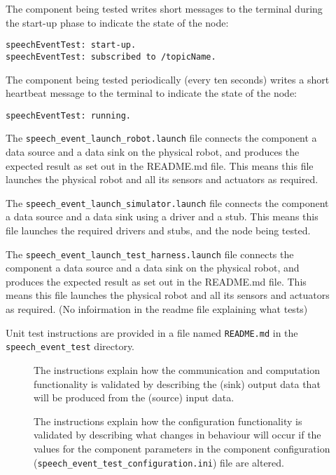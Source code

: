 \documentclass{CSSRforAfrica}
\newcommand{\checkboxChecked}{\fbox{\ding{51}}} %
\newcommand{\checkboxDashed}{\fbox{--}}         %
\begin{document}
\begin{description}
\item[\checkboxChecked]  The component being tested writes short messages to the terminal during the start-up phase to indicate the state of the node:
{\small 
\begin{verbatim}
speechEventTest: start-up.
speechEventTest: subscribed to /topicName.
\end{verbatim}}

\item[\checkboxChecked]   The component being tested periodically (every ten seconds) writes a short heartbeat message to the terminal to indicate the state of the node:
{\small 
\begin{verbatim}
speechEventTest: running.
\end{verbatim}}

\item[\checkboxChecked] The {\small \verb+speech_event_launch_robot.launch+} file connects the component a data source and a data sink on the physical robot, and produces the expected result as set out in the README.md file. This means this file launches the physical robot and all its sensors and actuators as required.

\item[\checkboxDashed]   The {\small \verb+speech_event_launch_simulator.launch+} file connects the component a data source and a data sink using a driver and a stub. This means this file launches the required drivers and stubs, and the node being tested.

\item[\checkboxChecked]   The {\small \verb+speech_event_launch_test_harness.launch+} file connects the component a data source and a data sink on the physical robot, and produces the expected result as set out in the README.md file. This means this file launches the physical robot and all its sensors and actuators as required. (No infoirmation in the readme file explaining what tests)

\item[\checkboxChecked] Unit test instructions are provided in a file named {\small \verb+README.md+} in the  {\small \verb+speech_event_test+} directory. 


\begin{description}

\item[\checkboxChecked] The instructions explain how the communication and computation functionality is validated by describing the (sink) output data that will be produced from the (source) input data.  

\item[\checkboxChecked] The instructions explain how the configuration functionality is validated by describing what changes in behaviour will occur if the values for the component parameters in the component configuration ({\small \verb+speech_event_test_configuration.ini+}) file are altered.

\end{description}

\end{description} 
\end{document}
